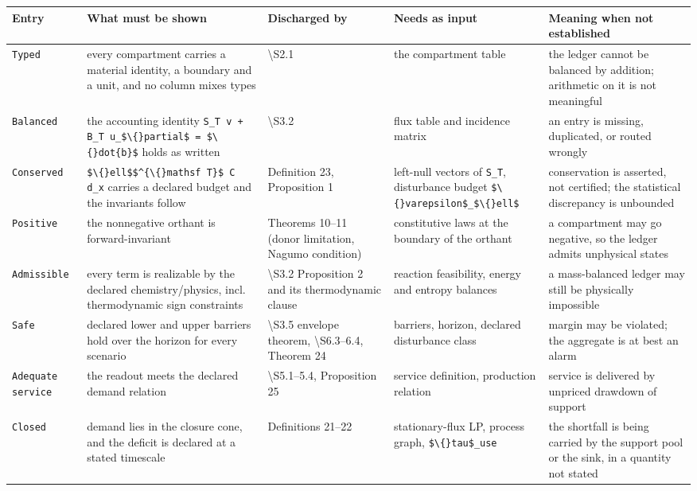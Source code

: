 \documentclass[11pt]{article}
\begin{document}
\begin{longtable}{@{}l|p{39mm}|p{39mm}|p{39mm}|p{39mm}@{}}
\toprule
Entry & What must be shown & Discharged by & Needs as input & Meaning when not established \\
\midrule
\texttt{Typed} & every compartment carries a material identity, a boundary and a unit, and no column mixes types & \textbackslash{}S{}2.1 & the compartment table & the ledger cannot be balanced by addition; arithmetic on it is not meaningful \\
\texttt{Balanced} & the accounting identity \texttt{S\_T v + B\_T u\_\$\textbackslash\{\}partial\$ = \$\textbackslash\{\}dot\{b\}\$} holds as written & \textbackslash{}S{}3.2 & flux table and incidence matrix & an entry is missing, duplicated, or routed wrongly \\
\texttt{Conserved} & \texttt{\$\textbackslash\{\}ell\$\$\textasciicircum{}\{\textbackslash\{\}mathsf T\}\$ C d\_x} carries a declared budget and the invariants follow & Definition 23, Proposition 1 & left-null vectors of \texttt{S\_T}, disturbance budget \texttt{\$\textbackslash\{\}varepsilon\$\_\$\textbackslash\{\}ell\$} & conservation is asserted, not certified; the statistical discrepancy is unbounded \\
\texttt{Positive} & the nonnegative orthant is forward-invariant & Theorems 10--11 (donor limitation, Nagumo condition) & constitutive laws at the boundary of the orthant & a compartment may go negative, so the ledger admits unphysical states \\
\texttt{Admissible} & every term is realizable by the declared chemistry/physics, incl. thermodynamic sign constraints & \textbackslash{}S{}3.2 Proposition 2 and its thermodynamic clause & reaction feasibility, energy and entropy balances & a mass-balanced ledger may still be physically impossible \\
\texttt{Safe} & declared lower and upper barriers hold over the horizon for every scenario & \textbackslash{}S{}3.5 envelope theorem, \textbackslash{}S{}6.3--6.4, Theorem 24 & barriers, horizon, declared disturbance class & margin may be violated; the aggregate is at best an alarm \\
\texttt{Adequate service} & the readout meets the declared demand relation & \textbackslash{}S{}5.1--5.4, Proposition 25 & service definition, production relation & service is delivered by unpriced drawdown of support \\
\texttt{Closed} & demand lies in the closure cone, and the deficit is declared at a stated timescale & Definitions 21--22 & stationary-flux LP, process graph, \texttt{\$\textbackslash\{\}tau\$\_use} & the shortfall is being carried by the support pool or the sink, in a quantity not stated \\
\bottomrule
\end{longtable}
\end{document}
